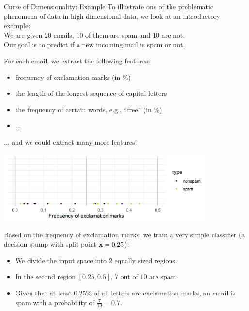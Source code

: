 \documentclass[11pt,compress,t,notes=noshow, xcolor=table]{beamer}
\begin{document}
\begin{vbframe}{Curse of Dimensionality: Example}
To illustrate one of the problematic phenomena of data in high dimensional data, we look at an introductory example: \\ \lz
We are given $20$ emails, $10$ of them are spam and $10$ are not. \\
Our goal is to predict if a new incoming mail is spam or not. 

\medskip

For each email, we extract the following features:

\begin{itemize}
\item frequency of exclamation marks (in \%)
\item the length of the longest sequence of capital letters
\item the frequency of certain words, e.g., \enquote{free} (in \%)
\item ... 
\end{itemize}

... and we could extract many more features!

\framebreak



\vspace*{0.1cm}
\begin{center}
\includegraphics[width = 11cm ]{figure/exclamation_marks_plot.png}
\end{center}

Based on the frequency of exclamation marks, we train a very simple classifier (a decision stump with split point $\mathbf{x} = 0.25$):

\begin{itemize}
\item We divide the input space into $2$ equally sized regions.
\item In the second region $[0.25, 0.5]$, $7$ out of $10$ are spam.
\item Given that at least $0.25\%$ of all letters are exclamation marks, an email is spam with a probability of $\frac{7}{10} = 0.7$.
\end{itemize}
\framebreak



\end{vbframe}
\end{document}
